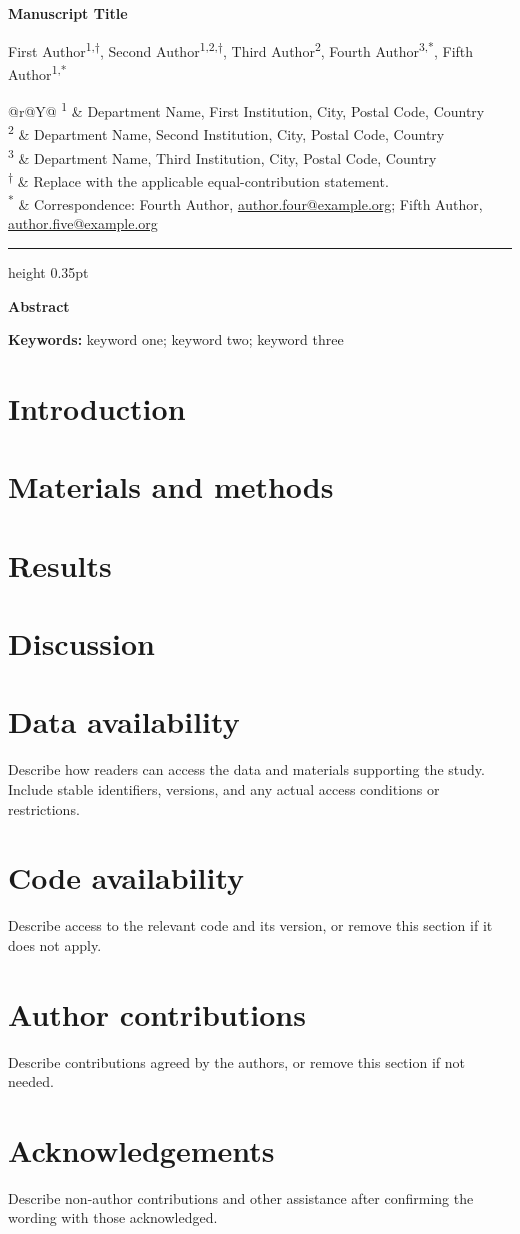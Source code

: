 \documentclass[11pt,a4paper]{article}
\makeatletter
\newcommand{\papertitle}{Manuscript Title}
\newcommand{\paperauthors}{%
  First Author\textsuperscript{1,\ensuremath{\dagger}},
  Second Author\textsuperscript{1,2,\ensuremath{\dagger}},
  Third Author\textsuperscript{2},
  Fourth Author\textsuperscript{3,*},
  Fifth Author\textsuperscript{1,*}
}
\newcommand{\paperinstitutionone}{Department Name, First Institution, City, Postal Code, Country}
\newcommand{\paperinstitutiontwo}{Department Name, Second Institution, City, Postal Code, Country}
\newcommand{\paperinstitutionthree}{Department Name, Third Institution, City, Postal Code, Country}
\newcommand{\equalcontribution}{Replace with the applicable equal-contribution statement.}
\newcommand{\correspondence}{Correspondence: Fourth Author, \href{mailto:author.four@example.org}{author.four@example.org}; Fifth Author, \href{mailto:author.five@example.org}{author.five@example.org}}
\newcommand{\paperkeywords}{keyword one; keyword two; keyword three}
\newcommand{\papermetadata}{%
  \begingroup
  \small\linespread{1.05}\selectfont
  \setlength{\tabcolsep}{0pt}
  \renewcommand{\arraystretch}{1.15}
  \begin{tabularx}{\linewidth}{@{}r@{\hspace{0.3em}}Y@{}}
    \textsuperscript{1} & \paperinstitutionone \\
    \textsuperscript{2} & \paperinstitutiontwo \\
    \textsuperscript{3} & \paperinstitutionthree \\
    \addlinespace[0.55em]
    \textsuperscript{\ensuremath{\dagger}} & \equalcontribution \\
    \textsuperscript{*} & \correspondence \\
  \end{tabularx}
  \par\endgroup
}
\newcommand{\makepapertitle}{%
  \begingroup
  \RaggedRight
    {\LARGE\bfseries\linespread{1.08}\selectfont \papertitle\par}
    \vspace{0.8em}
    {\large\linespread{1.12}\selectfont \paperauthors\par}
    \vspace{0.55em}
    \papermetadata
  \par\endgroup
  \vspace{0.75em}
  {\color{paperrule}\hrule height 0.35pt}
  \vspace{1em}
}
\newenvironment{paperabstract}{%
  \par\vspace{0.2em}
  {\large\sffamily\bfseries Abstract\par}
  \vspace{0.35em}
  \begingroup
  \normalsize
  \setlength{\parindent}{0pt}
  \setlength{\parskip}{6pt}
}{%
  \par\endgroup
  \vspace{0.45em}
}
\makeatother
\begin{document}
\thispagestyle{plain}
\makepapertitle

\begin{paperabstract}

\end{paperabstract}

\textbf{Keywords:} \paperkeywords

\section{Introduction}


\section{Materials and methods}


\section{Results}


\section{Discussion}


\section*{Data availability}
Describe how readers can access the data and materials supporting the study. Include stable identifiers, versions, and any actual access conditions or restrictions.

\section*{Code availability}
Describe access to the relevant code and its version, or remove this section if it does not apply.

\section*{Author contributions}
Describe contributions agreed by the authors, or remove this section if not needed.

\section*{Acknowledgements}
Describe non-author contributions and other assistance after confirming the wording with those acknowledged.
\end{document}
